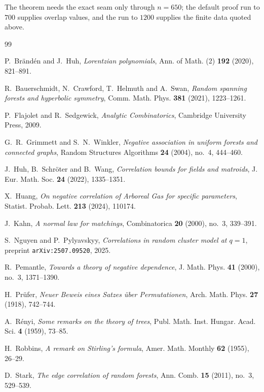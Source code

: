 \documentclass[11pt,a4paper]{amsart}
\theoremstyle{plain}
\theoremstyle{definition}
\begin{document}
The theorem needs the exact seam only through $n=650$; the default proof run to
$700$ supplies overlap values, and the run to $1200$ supplies the finite data
quoted above.

\begin{thebibliography}{99}

 P.~Br\"and\'en and J.~Huh,
\emph{Lorentzian polynomials},
Ann. of Math. (2) \textbf{192} (2020), 821--891.

 R.~Bauerschmidt, N.~Crawford, T.~Helmuth and A.~Swan,
\emph{Random spanning forests and hyperbolic symmetry},
Comm. Math. Phys. \textbf{381} (2021), 1223--1261.

 P.~Flajolet and R.~Sedgewick,
\emph{Analytic Combinatorics},
Cambridge University Press, 2009.

 G.~R.~Grimmett and S.~N.~Winkler,
\emph{Negative association in uniform forests and connected graphs},
Random Structures Algorithms \textbf{24} (2004), no.~4, 444--460.

 J.~Huh, B.~Schr\"oter and B.~Wang,
\emph{Correlation bounds for fields and matroids},
J. Eur. Math. Soc. \textbf{24} (2022), 1335--1351.

 X.~Huang,
\emph{On negative correlation of Arboreal Gas for specific parameters},
Statist. Probab. Lett. \textbf{213} (2024), 110174.

 J.~Kahn,
\emph{A normal law for matchings},
Combinatorica \textbf{20} (2000), no.~3, 339--391.

 S.~Nguyen and P.~Pylyavskyy,
\emph{Correlations in random cluster model at $q=1$},
preprint \nolinkurl{arXiv:2507.09520}, 2025.

 R.~Pemantle,
\emph{Towards a theory of negative dependence},
J. Math. Phys. \textbf{41} (2000), no.~3, 1371--1390.

 H.~Pr\"ufer,
\emph{Neuer Beweis eines Satzes \"uber Permutationen},
Arch. Math. Phys. \textbf{27} (1918), 742--744.

 A.~R\'enyi,
\emph{Some remarks on the theory of trees},
Publ. Math. Inst. Hungar. Acad. Sci. \textbf{4} (1959), 73--85.

 H.~Robbins,
\emph{A remark on Stirling's formula},
Amer. Math. Monthly \textbf{62} (1955), 26--29.

 D.~Stark,
\emph{The edge correlation of random forests},
Ann. Comb. \textbf{15} (2011), no.~3, 529--539.


\end{thebibliography}
\end{document}

